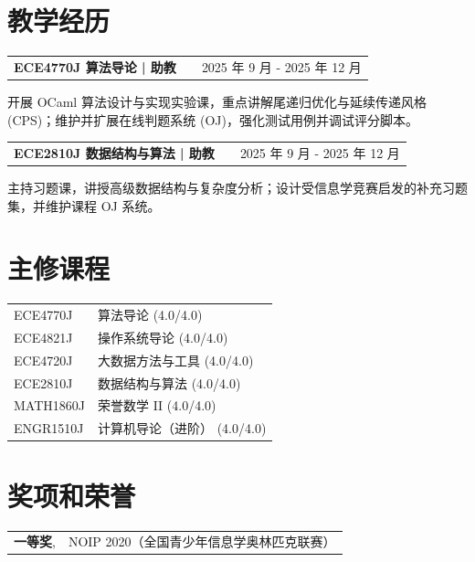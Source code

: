 \documentclass[a4paper,12pt]{article}
\makeatletter
\newenvironment{jobshort}[2]
    {
    \begin{tabularx}{\linewidth}{@{}l X r@{}}
    \textbf{#1} & \hfill &  #2 \\[3.75pt]
    \end{tabularx}
    }
    {
    }
\makeatother
\begin{document}

\section{教学经历}

\begin{jobshort}{ECE4770J 算法导论 | 助教}{2025 年 9 月 - 2025 年 12 月}
开展 OCaml 算法设计与实现实验课，重点讲解尾递归优化与延续传递风格 (CPS)；维护并扩展在线判题系统 (OJ)，强化测试用例并调试评分脚本。
\end{jobshort}

\begin{jobshort}{ECE2810J 数据结构与算法 | 助教}{2025 年 9 月 - 2025 年 12 月}
主持习题课，讲授高级数据结构与复杂度分析；设计受信息学竞赛启发的补充习题集，并维护课程 OJ 系统。
\end{jobshort}


\section{主修课程}
\begin{tabularx}{\linewidth}{@{}l X@{}}	
ECE4770J & 算法导论 \hfill \normalsize (4.0/4.0)\\
ECE4821J & 操作系统导论 \hfill \normalsize (4.0/4.0)\\
ECE4720J & 大数据方法与工具 \hfill \normalsize (4.0/4.0)\\
ECE2810J & 数据结构与算法 \hfill \normalsize (4.0/4.0)\\
MATH1860J & 荣誉数学 II \hfill \normalsize (4.0/4.0)\\
ENGR1510J & 计算机导论（进阶） \hfill \normalsize (4.0/4.0)
\end{tabularx}


\section{奖项和荣誉}
\begin{tabularx}{\linewidth}{@{}l X@{}}
\textbf{一等奖}, & NOIP 2020（全国青少年信息学奥林匹克联赛） \\
\end{tabularx}
\end{document}
